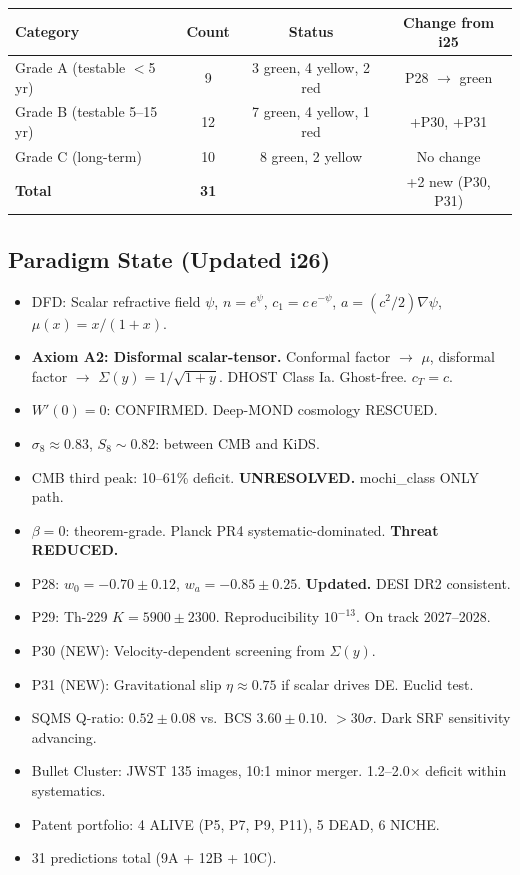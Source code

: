 \documentclass[11pt,a4paper]{article}
\begin{document}
\begin{center}
\begin{tabular}{lccc}
\toprule
\textbf{Category} & \textbf{Count} & \textbf{Status} & \textbf{Change from i25} \\
\midrule
Grade A (testable $<$5 yr) & 9 & 3 green, 4 yellow, 2 red & P28 $\to$ green \\
Grade B (testable 5--15 yr) & 12 & 7 green, 4 yellow, 1 red & +P30, +P31 \\
Grade C (long-term) & 10 & 8 green, 2 yellow & No change \\
\midrule
\textbf{Total} & \textbf{31} & & +2 new (P30, P31) \\
\bottomrule
\end{tabular}
\end{center}

\subsection{Paradigm State (Updated i26)}

\begin{itemize}
\item DFD: Scalar refractive field $\psi$, $n = e^\psi$, $c_1 = c\,e^{-\psi}$, $a = (c^2/2)\nabla\psi$, $\mu(x) = x/(1+x)$.
\item \textbf{Axiom A2: Disformal scalar-tensor.} Conformal factor $\to$ $\mu$, disformal factor $\to$ $\Sigma(y) = 1/\sqrt{1+y}$. DHOST Class Ia. Ghost-free. $c_T = c$.
\item $W'(0) = 0$: CONFIRMED. Deep-MOND cosmology RESCUED.
\item $\sigma_8 \approx 0.83$, $S_8 \sim 0.82$: between CMB and KiDS.
\item CMB third peak: 10--61\% deficit. \textbf{UNRESOLVED.} mochi\_class ONLY path.
\item $\beta = 0$: theorem-grade. Planck PR4 systematic-dominated. \textbf{Threat REDUCED.}
\item P28: $w_0 = -0.70 \pm 0.12$, $w_a = -0.85 \pm 0.25$. \textbf{Updated.} DESI DR2 consistent.
\item P29: Th-229 $K = 5900 \pm 2300$. Reproducibility $10^{-13}$. On track 2027--2028.
\item P30 (NEW): Velocity-dependent screening from $\Sigma(y)$.
\item P31 (NEW): Gravitational slip $\eta \approx 0.75$ if scalar drives DE. Euclid test.
\item SQMS Q-ratio: $0.52 \pm 0.08$ vs.\ BCS $3.60 \pm 0.10$. $>$30$\sigma$. Dark SRF sensitivity advancing.
\item Bullet Cluster: JWST 135 images, 10:1 minor merger. 1.2--2.0$\times$ deficit within systematics.
\item Patent portfolio: 4 ALIVE (P5, P7, P9, P11), 5 DEAD, 6 NICHE.
\item 31 predictions total (9A + 12B + 10C).
\end{itemize}
\end{document}
